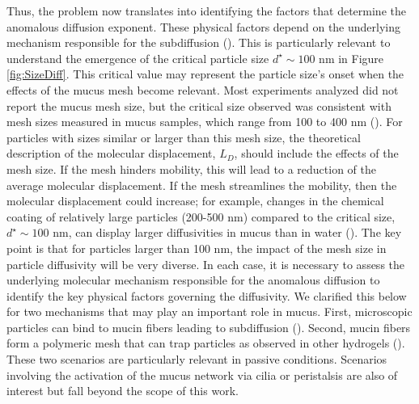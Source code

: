 \documentclass[aps,prl,preprint,superscriptaddress,showkeys,linenumbers]{revtex4-1}
\begin{document}
Thus, the problem now translates into identifying the factors that determine the anomalous diffusion exponent. These physical factors depend on the underlying mechanism responsible for the subdiffusion (\cite{Metzler2014}).
This is particularly relevant to understand the emergence of the critical particle size $d^{\star} \sim 100$ nm in Figure \ref{fig:SizeDiff}. This critical value may represent the particle size's onset when the effects of the mucus mesh become relevant. Most experiments analyzed did not report the mucus mesh size, but the critical size observed was consistent with mesh sizes measured in mucus samples, which range from 100 to 400 nm (\cite{Suk2009Biomaterials,Lai2010PNAS,Lai2011Biomaterials,Ensign2012SciTranslMed,SpagnSPRINGER2015}). For particles with sizes similar or larger than this mesh size, the theoretical description of the molecular displacement, $L_D$, should include the effects of the mesh size. If the mesh hinders mobility, this will lead to a reduction of the average molecular displacement. If the mesh streamlines the mobility, then the molecular displacement could increase; for example, changes in the chemical coating of relatively large particles (200-500 nm) compared to the critical size, $d^{\star} \sim 100$ nm, can display larger diffusivities in mucus than in water (\cite{LaiPNAS2007}). The key point is that for particles \textcolor{Antonio}{larger than} 100 nm, the impact of the mesh size in particle diffusivity will be very diverse. In each case, it is necessary to assess the underlying molecular mechanism responsible for the anomalous diffusion to identify the key physical factors governing the diffusivity. We clarified this below for two mechanisms that may play an important role in mucus. First, microscopic particles can bind to mucin fibers leading to subdiffusion (\cite{BarrPNAS2015}). Second, mucin fibers form a polymeric mesh that can trap particles as observed in other hydrogels (\cite{Wong_2004}). These two scenarios are particularly relevant in passive conditions. Scenarios involving the activation of the mucus network via cilia or peristalsis are also of interest but fall beyond the scope of this work.  
\end{document}

